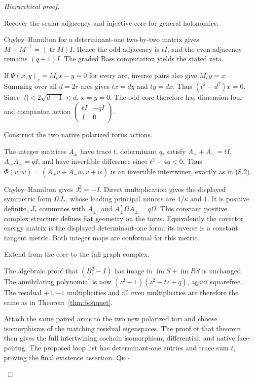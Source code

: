\documentclass[11pt,a4paper]{article}
\theoremstyle{remark}\newtheorem{remark}[definition]{Remark}
\newcommand{\tr}{\operatorname{tr}}\newcommand{\im}{\operatorname{im}}
\newcommand{\QED}{\textsc{Qed}}
\begin{document}
\begin{proof}[Hierarchical proof]
\begin{steps}
\item Recover the scalar adjacency and injective core for general holonomies.
\begin{steps}
\item Cayley--Hamilton for a determinant-one two-by-two matrix gives $M+M^{-1}=(\tr M)I$. Hence the odd adjacency is $tI$, and the even adjacency remains $(q+1)I$. The graded Bass computation yields the stated zeta.
\item If $\Psi(x,y)_c=M_cx-y=0$ for every arc, inverse pairs also give $M_cy=x$. Summing over all $d=2r$ arcs gives $tx=dy$ and $ty=dx$. Thus $(t^2-d^2)x=0$. Since $|t|<2\sqrt{d-1}<d$, $x=y=0$. The odd core therefore has dimension four and companion action $\left(\begin{smallmatrix}tI&-qI\\I&0\end{smallmatrix}\right)$.
\end{steps}
\item Construct the two native polarized torus actions.
\begin{steps}
\item The integer matrices $A_\pm$ have trace $t$, determinant $q$, satisfy $A_++A_-=tI$, $A_+A_-=qI$, and have invertible difference since $t^2-4q<0$. Thus $\Phi(v,w)=(A_+v+A_-w,v+w)$ is an invertible intertwiner, exactly as in (8.2).
\item Cayley--Hamilton gives $J_*^2=-I$. Direct multiplication gives the displayed symmetric form $\Omega J_*$, whose leading principal minors are $1/\kappa$ and $1$. It is positive definite, $J_*$ commutes with $A_\pm$, and $A_\pm^T\Omega A_\pm=q\Omega$. This constant positive complex structure defines flat geometry on the torus. Equivalently the covector energy matrix is the displayed determinant-one form; its inverse is a constant tangent metric. Both integer maps are conformal for this metric.
\end{steps}
\item Extend from the core to the full graph complex.
\begin{steps}
\item The algebraic proof that $(B_1^2-I)$ has image in $\im S+\im RS$ is unchanged. The annihilating polynomial is now $(z^2-1)(z^2-tz+q)$, again squarefree. The residual $+1,-1$ multiplicities and all even multiplicities are therefore the same as in Theorem~\ref{thm:bouquet}.
\item Attach the same paired arms to the two new polarized tori and choose isomorphisms of the matching residual eigenspaces. The proof of that theorem then gives the full intertwining cochain isomorphism, differential, and native face pairing. The proposed loop list has determinant-one entries and trace sum $t$, proving the final existence assertion. \QED.
\end{steps}
\end{steps}
\end{proof}
\end{document}
